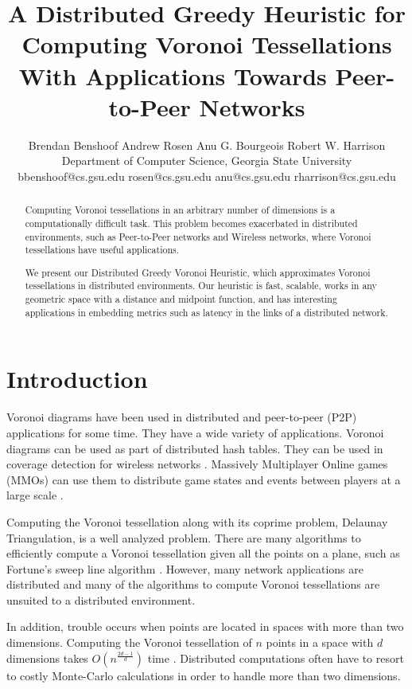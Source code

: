 \documentclass[11pt, conference, letterpaper]{IEEEtran}
\title{A Distributed Greedy Heuristic for Computing Voronoi Tessellations With Applications Towards Peer-to-Peer Networks}
\author{Brendan Benshoof \qquad Andrew Rosen \qquad Anu G. Bourgeois \qquad Robert W. Harrison \\Department of Computer Science, Georgia State University\\  bbenshoof@cs.gsu.edu \qquad rosen@cs.gsu.edu \qquad anu@cs.gsu.edu \qquad rharrison@cs.gsu.edu}
\date{} %
\begin{document}
\maketitle

\begin{abstract}
Computing Voronoi tessellations in an arbitrary number of dimensions is a computationally difficult task.
This problem becomes exacerbated in distributed environments, such as Peer-to-Peer networks and Wireless networks, where Voronoi tessellations have useful applications.

We present our Distributed Greedy Voronoi Heuristic, which approximates Voronoi tessellations in distributed environments.
Our heuristic is fast, scalable, works in any geometric space with a distance and midpoint function, and has interesting applications in embedding metrics such as latency in the links of a distributed network.
\end{abstract}


\section{Introduction}


Voronoi diagrams \cite{voronoi} have been used in distributed and  peer-to-peer (P2P) applications for some time. 
They have a wide variety of applications.
Voronoi diagrams can be used as part of distributed hash tables\cite{virtvoro}.
They can be used in coverage detection for wireless networks \cite{carbunar2004distributed}.
Massively Multiplayer Online games (MMOs) can use them to distribute game states and events between players at a large scale \cite{hu2004scalable} \cite{hu2008voronoi} \cite{Backhaus:2007:VAS:1326257.1326266}.

Computing the Voronoi tessellation along with its coprime problem, Delaunay Triangulation, is a well analyzed problem.
There are many algorithms to efficiently compute a Voronoi tessellation given all the points on a plane, such as Fortune's sweep line algorithm \cite{fortune1987sweepline}.
However, many network applications are distributed and many of the algorithms to compute Voronoi tessellations are unsuited to a distributed environment.

In addition, trouble occurs when points are located in spaces with more than two dimensions.
Computing the Voronoi tessellation of $n$ points in a space with $d$ dimensions takes $O(n^{\frac{2d-1}{d}})$ time \cite{watson1981computing}.
Distributed computations often have to resort to costly Monte-Carlo calculations \cite{raynet} in order to handle more than two dimensions.
\end{document}
